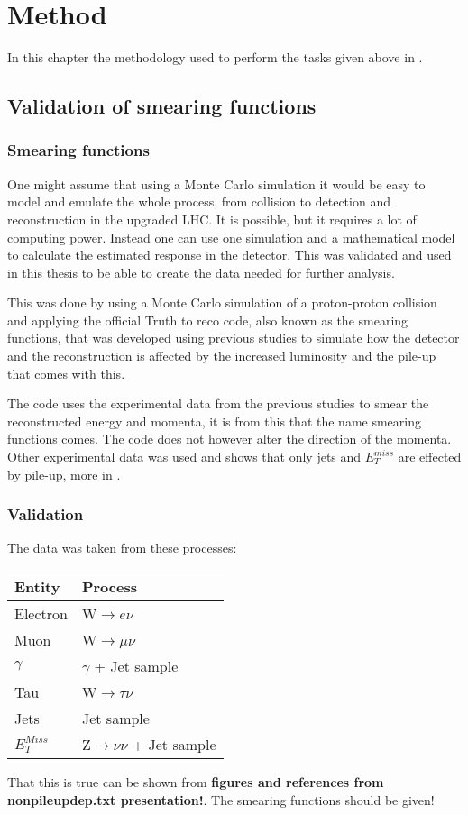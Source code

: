 \chapter{Method}\label{cha:meth}
In this chapter the methodology used to perform the tasks given above in .
\newpage
\section{Validation of smearing functions} 
\subsection{Smearing functions}\label{sec:vali:subsec:smear}
One might assume that using a Monte Carlo simulation it would be easy to model and emulate the whole process, from collision to detection and reconstruction in the upgraded LHC. It is possible, but it requires a lot of computing power. Instead one can use one simulation and a mathematical model to calculate the estimated response in the detector. This was validated and used in this thesis to be able to create the data needed for further analysis. 

This was done by using a Monte Carlo simulation of a proton-proton collision and applying the official Truth to reco code, also known as the smearing functions, that was developed using previous studies \citep{ATL-PHYS-PUB-2013-004} to simulate how the detector and the reconstruction is affected by the increased luminosity and the pile-up that comes with this.

The code uses the experimental data from the previous studies to smear the reconstructed energy and momenta, it is from this that the name smearing functions comes.
The code does not however alter the direction of the momenta. Other experimental data was used and shows that only jets and $E^{miss}_T$ are effected by pile-up, more in .

\subsection{Validation}\label{sec:vali:subsec:vali}
The data was taken from these processes:
\begin{table}[h]
\begin{center}
\begin{tabular}{|l|l|}
\hline
Entity & Process \\ \hline
Electron & W$\rightarrow e\nu$ \\
Muon & W$\rightarrow \mu \nu$ \\
$\gamma$ & $\gamma$ + Jet sample \\
Tau & W$\rightarrow \tau \nu$ \\
Jets & Jet sample \\
$E_T^{Miss}$ & Z$\rightarrow \nu \nu$ + Jet sample \\ \hline
\end{tabular}
\end{center}
\end{table}
That this is true can be shown from \textbf{figures and references from nonpileupdep.txt presentation!}. The smearing functions should be given!

